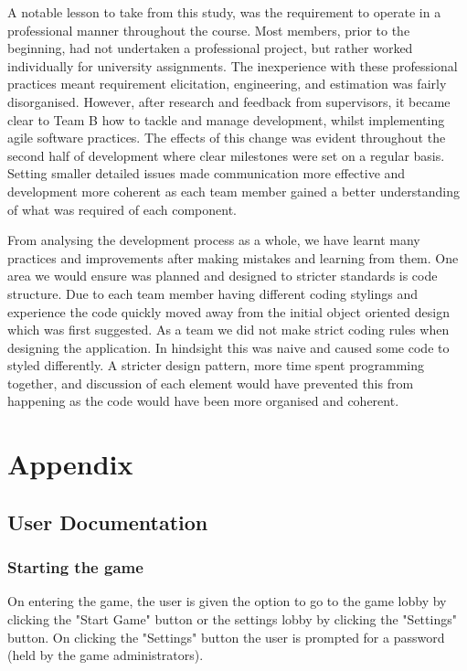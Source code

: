 \documentclass{l3proj}
\begin{document}
A notable lesson to take from this study, was the requirement to operate in a  professional manner throughout the course. Most members, prior to the beginning, had not undertaken a professional project, but rather worked individually for university assignments. The inexperience with these professional practices meant requirement elicitation, engineering, and estimation was fairly disorganised. However, after research and feedback from supervisors, it became clear to Team B how to tackle and manage development, whilst implementing agile software practices. The effects of this change was evident throughout the second half of development where clear milestones were set on a regular basis. Setting smaller detailed issues made communication more effective and development more coherent as each team member gained a better understanding of what was required of each component.

From analysing the development process as a whole, we have learnt many practices and improvements after making mistakes and learning from them. One area we would ensure was planned and designed to stricter standards is code structure. Due to each team member having different coding stylings and experience the code quickly moved away from the initial object oriented design which was first suggested. As a team we did not make strict coding rules when designing the application. In hindsight this was naive and caused some code to styled differently. A stricter design pattern, more time spent programming together, and discussion of each element would have prevented this from happening as the code would have been more organised and coherent.
\pagebreak
\section{Appendix}
\label{sec:appendix}

\subsection{User Documentation}
\subsubsection{Starting the game}
On entering the game, the user is given the option to go to the game lobby by clicking the "Start Game" button or the settings lobby by clicking the "Settings" button. On clicking the "Settings" button the user is prompted for a password (held by the game administrators).
\end{document}
